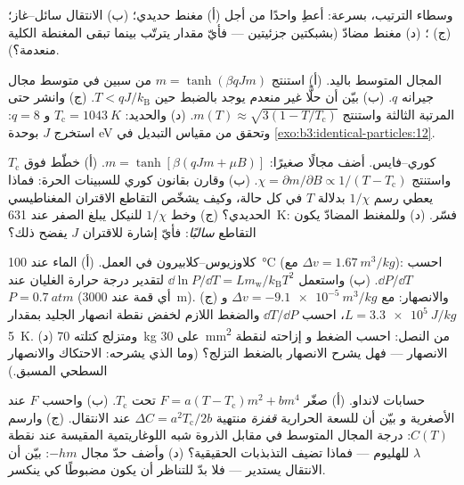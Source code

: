 \begin{exercise}[$\star$]\label{exo:b3:phase-transitions:4}
وسطاء الترتيب، بسرعة: أعطِ واحدًا من أجل (أ) مغنط حديدي؛ (ب)
الانتقال سائل--غاز؛ (ج) ؛ (د)
مغنط مضادّ (بشبكتين جزئيتين --- فأيّ مقدار يترتّب بينما
تبقى المغنطة الكلية منعدمة؟).
\end{exercise}

\begin{exercise}[$\star\star$]\label{exo:b3:phase-transitions:5}
المجال المتوسط باليد. (أ) استنتج $m = \tanh(\beta qJm)$ من سبين
في متوسط مجال جيرانه $q$. (ب) بيّن أن حلًّا غير منعدم
يوجد بالضبط حين $T < qJ/k_{\text{B}}$. (ج) وانشر حتى
المرتبة الثالثة واستنتج $m(T) \approx \sqrt{3(1 -
T/T_{\text{c}})}$. (د) والحديد: $T_{\text{c}} = \qty{1043}{K}$ و $q =
8$: استخرج $J$ بوحدة eV وتحقق من مقياس التبديل في
\cref{exo:b3:identical-particles:12}.
\end{exercise}

\begin{exercise}[$\star\star$]\label{exo:b3:phase-transitions:6}
كوري--فايس. أضف مجالًا صغيرًا: $m = \tanh[\beta(qJm + \mu B)]$.
(أ) خطّط فوق $T_{\text{c}}$ واستنتج $\chi = \partial
m/\partial B \propto 1/(T - T_{\text{c}})$. (ب) وقارن بقانون
كوري للسبينات الحرة: فماذا يعطي رسم $1/\chi$ بدلالة $T$
في كل حالة، وكيف يشخّص التقاطع الاقتران
المغناطيسي الحديدي؟ (ج) وخط $1/\chi$ للنيكل يبلغ الصفر عند \qty{631}{K}:
فسّر. (د) وللمغنط المضادّ يكون التقاطع
\emph{سالبًا}: فأيّ إشارة للاقتران $J$ يفضح ذلك؟
\end{exercise}

\begin{exercise}[$\star\star$]\label{exo:b3:phase-transitions:7}
كلاوزيوس--كلابيرون في العمل. (أ) الماء عند \qty{100}{\celsius}
(مع $\Delta v = \qty{1.67}{m^3/kg}$): احسب $\dd P/\dd T$. (ب)
واستعمل $\dd\ln P/\dd T = Lm_{\text{w}}/k_{\text{B}}T^2$ لتقدير
درجة حرارة الغليان عند $P = \qty{0.7}{atm}$ (أي قمة عند \qty{3000}{m}).
(ج) والانصهار: مع $\Delta v = \qty{-9.1e-5}{m^3/kg}$ و
$L = \qty{3.3e5}{J/kg}$، احسب $\dd T/\dd P$ والضغط
اللازم لخفض نقطة انصهار الجليد بمقدار \qty{5}{K}. (د) ومتزلج
كتلته \qty{70}{kg} على \qty{30}{mm^2} من النصل: احسب الضغط و
إزاحته لنقطة الانصهار --- فهل يشرح الانصهار بالضغط
التزلج؟ (وما الذي يشرحه: الاحتكاك والانصهار السطحي المسبق.)
\end{exercise}

\begin{exercise}[$\star\star$]\label{exo:b3:phase-transitions:8}
حسابات لانداو. (أ) صغّر $F = a(T - T_{\text{c}})m^2 +
bm^4$ تحت $T_{\text{c}}$. (ب) واحسب $F$ عند الأصغرية و
بيّن أن للسعة الحرارية \emph{قفزة} منتهية $\Delta C =
a^2T_{\text{c}}/2b$ عند الانتقال. (ج) وارسم $C(T)$:
درجة المجال المتوسط في مقابل الذروة شبه اللوغاريتمية المقيسة عند
نقطة $\lambda$ للهليوم --- فماذا تضيف التذبذبات الحقيقية؟ (د)
وأضف حدّ مجال $-hm$: بيّن أن الانتقال يستدير ---
فلا بدّ للتناظر أن يكون مضبوطًا كي ينكسر.
\end{exercise}


